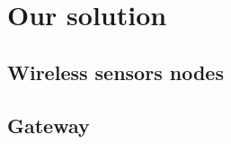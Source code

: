 \section{Our solution}
\label{sec:our_solution}






\subsection{Wireless sensors nodes}



\subsection{Gateway}


